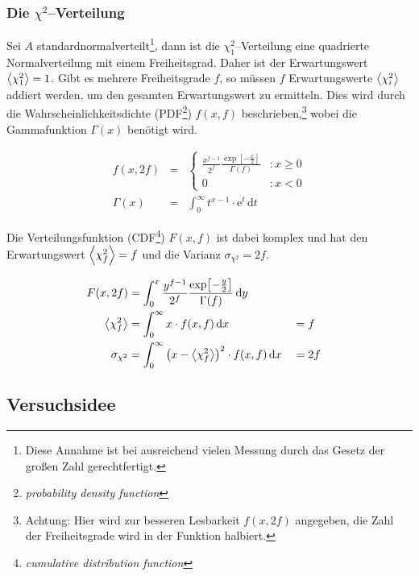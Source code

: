 \documentclass[12pt,a4paper]{scrartcl}
\numberwithin{equation}{section} %
\begin{document}
\hypertarget{die-chi2verteilung}{%
\subsubsection{Die $\chi^2$--Verteilung}\label{die-chi2verteilung}}

Sei $A$ standardnormalverteilt\footnote{Diese Annahme ist bei ausreichend vielen Messung durch das Gesetz der großen Zahl gerechtfertigt.}, dann ist die $\chi_1^2$--Verteilung eine quadrierte Normalverteilung mit einem Freiheitsgrad. Daher ist der Erwartungswert $\expval{\chi_1^2}=1$. Gibt es mehrere Freiheitsgrade $f$, so müssen $f$ Erwartungswerte $\expval{\chi_i^2}$ addiert werden, um den gesamten Erwartungswert zu ermitteln. Dies wird durch die Wahrscheinlichkeitsdichte (PDF\footnote{\emph{probability density function}}) $f(x, f)$ beschrieben,\footnote{Achtung: Hier wird zur besseren Lesbarkeit $f(x, 2f)$ angegeben, die Zahl der Freiheitsgrade wird in der Funktion halbiert.} wobei die Gammafunktion $\Gamma(x)$ benötigt wird.

\begin{eqnarray}
    f(x, 2f) &=&
        \begin{cases}
                \frac{x^{f-1}}{2^f}
                    \frac{\exp[-\frac{x}{2}]}{\Gamma(f)}
                    & : x\ge 0 \\
                0 & : x < 0
        \end{cases} \\
    \Gamma(x) &=& \int_0^\infty t^{x-1}\cdot \mathrm e^t \,\mathrm dt
\end{eqnarray}

Die Verteilungsfunktion (CDF\footnote{\emph{cumulative distribution function}}) $F(x, f)$ ist dabei komplex und hat den Erwartungswert $\expval{\chi_f^2}=f$ und die Varianz $\sigma_{\chi^2}=2f$.

\begin{align}
    F(x, 2f) &=
        \int_0^x
            \frac{y^{f-1}}{2^f}
                \frac{\exp[-\frac{y}{2}]}{\Gamma(f)}
            \,\mathrm dy \\
    \expval{\chi_f^2} &=
        \int_0^\infty x\cdot f(x, f)
            \,\mathrm dx
        &&= f \\
    \sigma_{\chi^2} &=
        \int_0^\infty \left(x - \expval{\chi_f^2}\right)^2 \cdot f(x, f)
            \,\mathrm dx
         &&=2f
\end{align}

\hypertarget{versuchsidee}{%
\subsection{Versuchsidee}\label{versuchsidee}}
\end{document}
